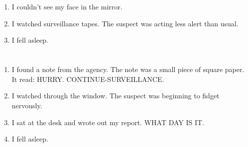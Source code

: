 \documentclass{article}
\begin{document}
    \newpage
    
    \section{}
    
    \begin{enumerate}
    
    \item I couldn't see my face in the mirror.\\
    
    \item I watched surveillance tapes. The suspect was acting less alert than usual.\\
    
    \item I fell asleep.\\
    
    \end{enumerate}
     
    \newpage
    
    \section{}
    
    \begin{enumerate}
    
    \item I found a note from the agency. The note was a small piece of square paper. It read: HURRY. CONTINUE-SURVEILLANCE.\\
    
    \item I watched through the window. The suspect was beginning to fidget nervously.\\
    
    \item I sat at the desk and wrote out my report. WHAT DAY IS IT.\\
    
    \item I fell asleep.\\
    
    \end{enumerate}
     
    \newpage
    
    \section{}
    
\end{document}
